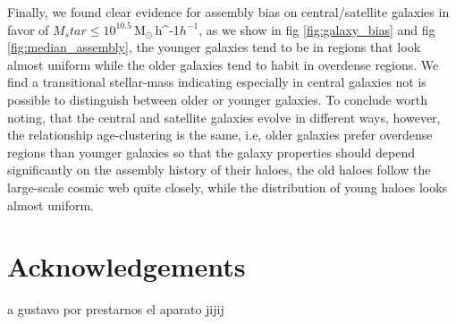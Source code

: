 \documentclass[a4paper,fleqn,usenatbib]{mnras}
\newcommand{\Msunh}{\,{\rm M}$_{\odot}$\,\ifmmode h^{-1}\else $h^{-1}$\fi}
\begin{document}
Finally, we found clear evidence for assembly bias on central/satellite galaxies in favor of $M_star \leq 10^{10.5}$\Msunh, as we show in fig \ref{fig:galaxy_bias} and fig \ref{fig:median_assembly}, the younger galaxies tend to be in regions that look almost uniform while the older galaxies tend to habit in overdense regions. We find a transitional stellar-mass indicating especially in central galaxies not is possible to distinguish between older or younger galaxies. 
To conclude worth noting, that the central and satellite galaxies evolve in different ways, however, the relationship age-clustering is the same, i.e, older galaxies prefer overdense regions than younger galaxies so that the galaxy properties should depend significantly on the assembly history of their haloes, the old haloes follow the large-scale cosmic web quite closely, while the distribution of young haloes looks almost uniform.







\section*{Acknowledgements}

a gustavo por prestarnos el aparato jijij






\bsp	%
\label{lastpage}
\end{document}

